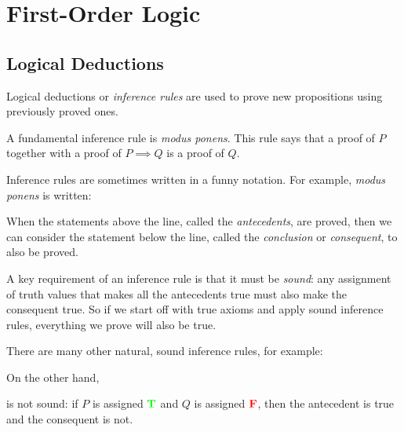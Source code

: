 \chapter{First-Order Logic}

\newcommand{\solves}{\text{Solves}}
\newcommand{\probs}{\text{Probs}}
\newcommand{\even}{\text{Evens}}
\newcommand{\primes}{\text{Primes}}


\section{Logical Deductions }

Logical deductions or \emph{inference rules} are used to prove new
propositions using previously proved ones.

A fundamental inference rule is \emph{modus ponens}.  This rule says that
a proof of $P$ together with a proof of $P \implies Q$ is a proof of
$Q$.

Inference rules are sometimes written in a funny notation.  For example,
\emph{modus ponens} is written:
\begin{rul*}
\end{rul*}

When the statements above the line, called the \emph{antecedents}, are
proved, then we can consider the statement below the line, called the
\emph{conclusion} or \emph{consequent}, to also be proved.

A key requirement of an inference rule is that it must be \emph{sound}: any
assignment of truth values that makes all the antecedents true must also
make the consequent true.  So if we start off with true axioms and apply
sound inference rules, everything we prove will also be true.

There are many other natural, sound inference rules, for example:
\begin{rul*}
\end{rul*}

\begin{rul*}
\end{rul*}

\begin{rul*}
\end{rul*}

On the other hand,
\begin{rul*}
\end{rul*}
is not sound: if $P$ is assigned $\textcolor{green}{\mathbf{T}}$ and $Q$ is assigned $\textcolor{red}{\mathbf{F}}$, then
the antecedent is true and the consequent is not.


